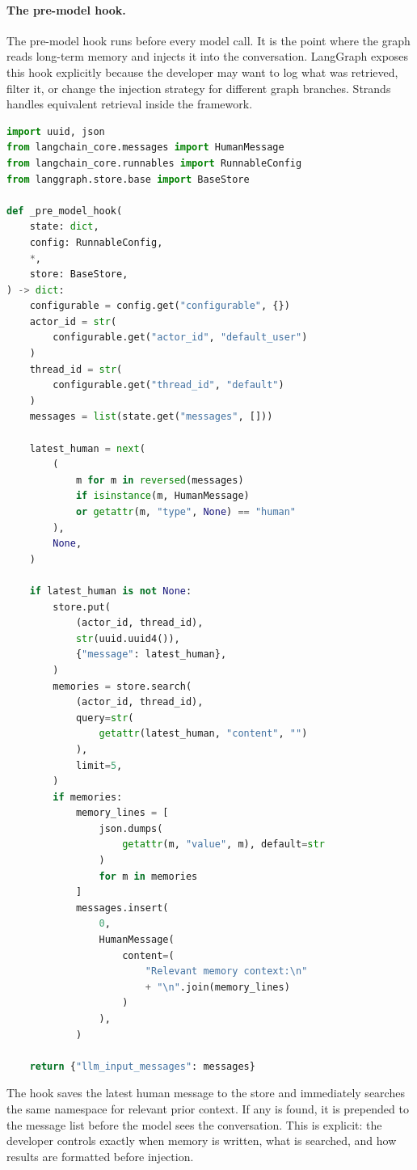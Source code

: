 \paragraph{The pre-model hook.}

The pre-model hook runs before every model call. It is the point where the graph reads
long-term memory and injects it into the conversation. LangGraph exposes this hook
explicitly because the developer may want to log what was retrieved, filter it, or change
the injection strategy for different graph branches. Strands handles equivalent retrieval
inside the framework.

\begin{lstlisting}[language=Python]
import uuid, json
from langchain_core.messages import HumanMessage
from langchain_core.runnables import RunnableConfig
from langgraph.store.base import BaseStore

def _pre_model_hook(
    state: dict,
    config: RunnableConfig,
    *,
    store: BaseStore,
) -> dict:
    configurable = config.get("configurable", {})
    actor_id = str(
        configurable.get("actor_id", "default_user")
    )
    thread_id = str(
        configurable.get("thread_id", "default")
    )
    messages = list(state.get("messages", []))

    latest_human = next(
        (
            m for m in reversed(messages)
            if isinstance(m, HumanMessage)
            or getattr(m, "type", None) == "human"
        ),
        None,
    )

    if latest_human is not None:
        store.put(
            (actor_id, thread_id),
            str(uuid.uuid4()),
            {"message": latest_human},
        )
        memories = store.search(
            (actor_id, thread_id),
            query=str(
                getattr(latest_human, "content", "")
            ),
            limit=5,
        )
        if memories:
            memory_lines = [
                json.dumps(
                    getattr(m, "value", m), default=str
                )
                for m in memories
            ]
            messages.insert(
                0,
                HumanMessage(
                    content=(
                        "Relevant memory context:\n"
                        + "\n".join(memory_lines)
                    )
                ),
            )

    return {"llm_input_messages": messages}
\end{lstlisting}

The hook saves the latest human message to the store and immediately searches the same
namespace for relevant prior context. If any is found, it is prepended to the message list
before the model sees the conversation. This is explicit: the developer controls exactly
when memory is written, what is searched, and how results are formatted before injection.

